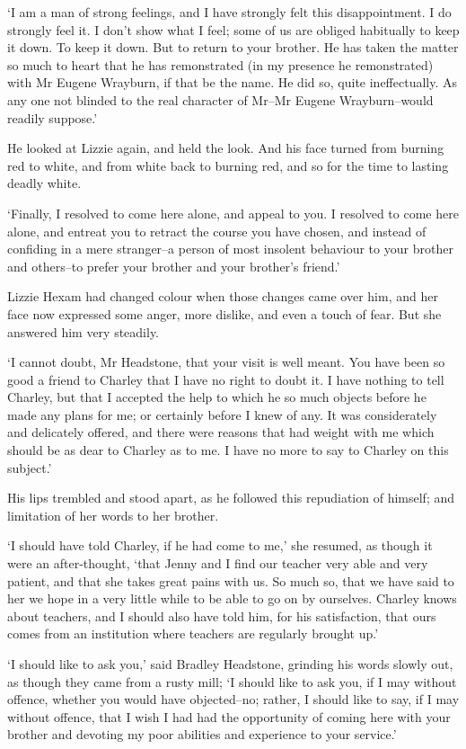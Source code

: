 ‘I am a man of strong feelings, and I have strongly felt this
disappointment. I do strongly feel it. I don’t show what I feel; some
of us are obliged habitually to keep it down. To keep it down. But to
return to your brother. He has taken the matter so much to heart that
he has remonstrated (in my presence he remonstrated) with Mr Eugene
Wrayburn, if that be the name. He did so, quite ineffectually. As any
one not blinded to the real character of Mr--Mr Eugene Wrayburn--would
readily suppose.’

He looked at Lizzie again, and held the look. And his face turned from
burning red to white, and from white back to burning red, and so for the
time to lasting deadly white.

‘Finally, I resolved to come here alone, and appeal to you. I resolved
to come here alone, and entreat you to retract the course you have
chosen, and instead of confiding in a mere stranger--a person of most
insolent behaviour to your brother and others--to prefer your brother
and your brother’s friend.’

Lizzie Hexam had changed colour when those changes came over him, and
her face now expressed some anger, more dislike, and even a touch of
fear. But she answered him very steadily.

‘I cannot doubt, Mr Headstone, that your visit is well meant. You have
been so good a friend to Charley that I have no right to doubt it. I
have nothing to tell Charley, but that I accepted the help to which he
so much objects before he made any plans for me; or certainly before I
knew of any. It was considerately and delicately offered, and there were
reasons that had weight with me which should be as dear to Charley as to
me. I have no more to say to Charley on this subject.’

His lips trembled and stood apart, as he followed this repudiation of
himself; and limitation of her words to her brother.

‘I should have told Charley, if he had come to me,’ she resumed, as
though it were an after-thought, ‘that Jenny and I find our teacher very
able and very patient, and that she takes great pains with us. So much
so, that we have said to her we hope in a very little while to be able
to go on by ourselves. Charley knows about teachers, and I should also
have told him, for his satisfaction, that ours comes from an institution
where teachers are regularly brought up.’

‘I should like to ask you,’ said Bradley Headstone, grinding his words
slowly out, as though they came from a rusty mill; ‘I should like to
ask you, if I may without offence, whether you would have objected--no;
rather, I should like to say, if I may without offence, that I wish I
had had the opportunity of coming here with your brother and devoting my
poor abilities and experience to your service.’

